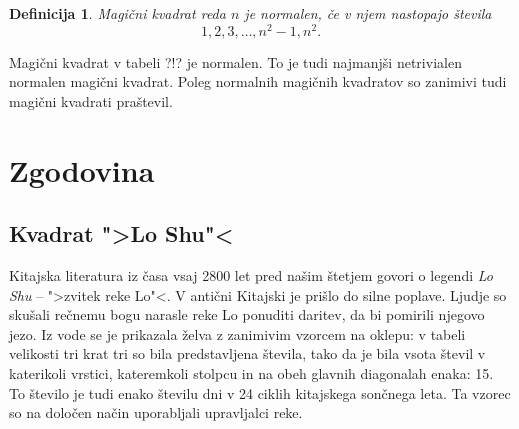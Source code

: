 \documentclass[a4paper,12pt]{article}
\newtheorem{definicija}{Definicija}
\newcommand{\pojem}[1]{\emph{\color{purple}#1}}
\begin{document}

\begin{definicija}
   Magični kvadrat reda $n$ je \pojem{normalen}, če v njem nastopajo števila
   \begin{equation}
      \label{eq:numbers}
      1, 2, 3, \ldots, n^2-1, n^2.
   \end{equation}
\end{definicija}

Magični kvadrat v tabeli ?!? je normalen.
To je tudi najmanjši netrivialen normalen magični kvadrat.
Poleg normalnih magičnih kvadratov so zanimivi tudi magični kvadrati praštevil.


\section{Zgodovina}

\subsection{Kvadrat ">Lo Shu"<}

Kitajska literatura iz časa vsaj 2800 let pred našim štetjem govori o legendi
\pojem{Lo Shu} -- ">zvitek reke Lo"<. V antični Kitajski je prišlo do
silne poplave. Ljudje so skušali rečnemu bogu narasle reke Lo ponuditi daritev,
da bi pomirili njegovo jezo. Iz vode se je prikazala želva z zanimivim vzorcem
na oklepu: v tabeli velikosti tri krat tri so bila predstavljena števila, tako
da je bila vsota števil v katerikoli vrstici, kateremkoli stolpcu in na obeh
glavnih diagonalah enaka: 15. To število je tudi enako številu dni v 24 ciklih
kitajskega sončnega leta. Ta vzorec so na določen način uporabljali upravljalci
reke.


\end{document}
